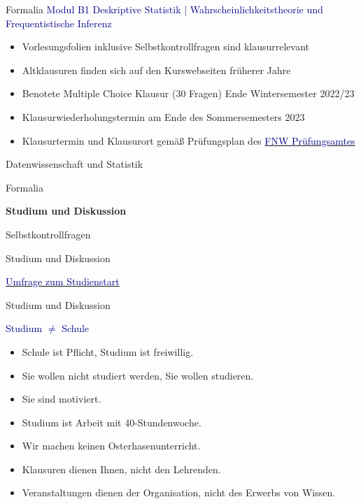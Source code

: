 \documentclass[
  8pt,
  ignorenonframetext,
]{beamer}
\providecommand{\tightlist}{%
  \setlength{\itemsep}{0pt}\setlength{\parskip}{0pt}}
\begin{document}
\begin{frame}{Formalia}
\protect\hypertarget{formalia-2}{}
\textcolor{darkblue}{Modul B1 Deskriptive Statistik | Wahrscheinlichkeitstheorie und Frequentistische Inferenz}

\begin{itemize}
\tightlist
\item
  Vorlesungsfolien inklusive Selbstkontrollfragen sind klausurrelevant
\item
  Altklausuren finden sich auf den Kurswebseiten früherer Jahre
\item
  Benotete Multiple Choice Klausur (30 Fragen) Ende Wintersemester
  2022/23
\item
  Klausurwiederholungstermin am Ende des Sommersemesters 2023
\item
  Klausurtermin und Klausurort gemäß Prüfungsplan des
  \href{https://www.fnw.ovgu.de/Studium/Pr\%C3\%BCfungsamt.html}{\textcolor{darkblue}{FNW Prüfungsamtes}}
\end{itemize}
\end{frame}

\begin{frame}{}
\protect\hypertarget{section-7}{}
\vfill
{}
\Large

Datenwissenschaft und Statistik

Formalia

\textbf{Studium und Diskussion}

Selbstkontrollfragen
\end{frame}

\begin{frame}{Studium und Diskussion}
\protect\hypertarget{studium-und-diskussion}{}
\large

\href{https://elearning.ovgu.de/mod/feedback/view.php?id=384185}{\textcolor{darkblue}{Umfrage zum Studienstart}}
\end{frame}

\begin{frame}{Studium und Diskussion}
\protect\hypertarget{studium-und-diskussion-1}{}
\large

\textcolor{darkblue}{Studium $\neq$ Schule} \normalsize

\begin{itemize}
\tightlist
\item
  Schule ist Pflicht, Studium ist freiwillig.
\item
  Sie wollen nicht studiert werden, Sie wollen studieren.
\item
  Sie sind motiviert.
\item
  Studium ist Arbeit mit 40-Stundenwoche.
\item
  Wir machen keinen Osterhasenunterricht.
\item
  Klausuren dienen Ihnen, nicht den Lehrenden.
\item
  Veranstaltungen dienen der Organisation, nicht des Erwerbs von Wissen.
\end{itemize}
\end{frame}
\end{document}
